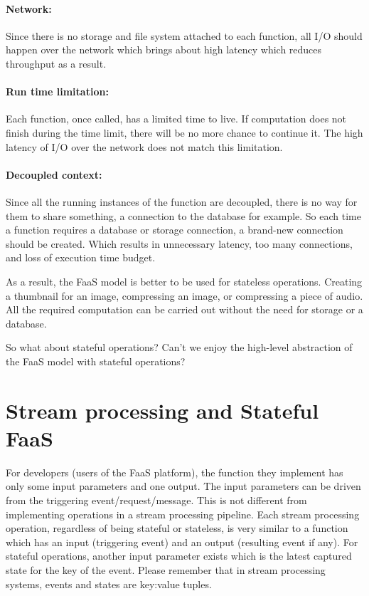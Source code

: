 \documentclass[a4]{report}
\begin{document}
    \paragraph{Network:} Since there is no storage and file system attached to each function, all I/O should happen over the network which brings about high latency which reduces throughput as a result.

    \paragraph{Run time limitation:} Each function, once called, has a limited time to live.
    If computation does not finish during the time limit, there will be no more chance to continue it.
    The high latency of I/O over the network does not match this limitation.

    \paragraph{Decoupled context:} Since all the running instances of the function are decoupled, there is
    no way for them to share something, a connection to the database for example.
    So each time a function requires a database or storage connection, a brand-new connection should be created.
    Which results in unnecessary latency, too many connections, and loss of execution time budget.

    As a result, the FaaS model is better to be used for stateless operations.
    Creating a thumbnail for an image, compressing an image, or compressing a piece of audio.
    All the required computation can be carried out without the need for storage or a database.

    So what about stateful operations?
    Can't we enjoy the high-level abstraction of the FaaS model with stateful operations?


    \section{Stream processing and Stateful FaaS}
    For developers (users of the FaaS platform), the function they implement has only some input parameters and one output.
    The input parameters can be driven from the triggering event/request/message.
    This is not different from implementing operations in a stream processing pipeline.
    Each stream processing operation, regardless of being stateful or stateless, is very similar to a function which has an input (triggering event) and an output (resulting event if any).
    For stateful operations, another input parameter exists which is the latest captured state for the key of the event.
    Please remember that in stream processing systems, events and states are key:value tuples.
\end{document}
